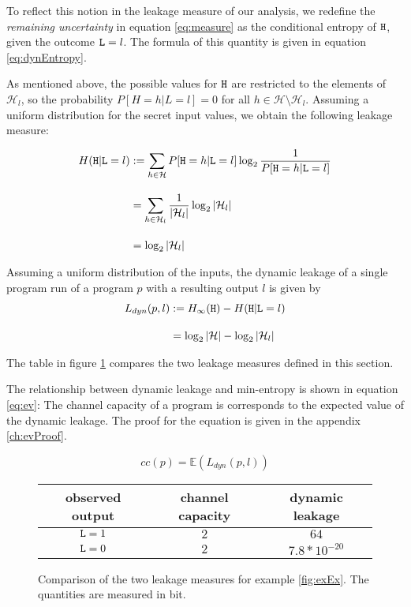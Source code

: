 To reflect this notion in the leakage measure of our analysis, we redefine the \emph{remaining uncertainty} in equation \ref{eq:measure} as the conditional entropy of $\mathtt{H}$, given the outcome $\mathtt{L} = l$. The formula of this quantity is given in equation \ref{eq:dynEntropy}.

As mentioned above, the possible values for $\mathtt{H}$ are restricted to the elements of $\mathcal{H}_l$, so the probability $P[H = h | L = l] = 0$ for all $h \in \mathcal{H} \setminus \mathcal{H}_l$. Assuming a uniform distribution for the secret input values, we obtain the following leakage measure:

\begin{align*}
    H(\mathtt{H} | \mathtt{L} = l) &:= \sum\limits_{h \in \mathcal{H}} P[\mathtt{H} = h | \mathtt{L} = l] \log_2 \frac{1}{P[\mathtt{H} = h | \mathtt{L} = l]} \\[1em]
    &= \sum\limits_{h \in \mathcal{H}_l} \frac{1}{|\mathcal{H}_l|} \log_2 |\mathcal{H}_l| \\[1em]
    &= \log_2 |\mathcal{H}_l|
\end{align*}

\begin{theorem}
    Assuming a uniform distribution of the inputs, the dynamic leakage of a single program run of a program $p$ with a resulting output $l$ is given by 
    \begin{align*}
        L_{dyn}(p, l) &:= H_\infty(\mathtt{H}) - H(\mathtt{H} | \mathtt{L} = l) \\[1em]
        &= \log_2 |\mathcal{H}| - \log_2 |\mathcal{H}_l|
    \end{align*}
\end{theorem}

The table in figure \ref{tab:comp} compares the two leakage measures defined in this section.

The relationship between dynamic leakage and min-entropy is shown in equation \ref{eq:ev}: The channel capacity of a program is corresponds to the expected value of the dynamic leakage. The proof for the equation is given in the appendix \ref{ch:evProof}.

\begin{center}
    \begin{equation}\label{eq:ev}
        cc(p) = \mathbb{E}(L_{dyn}(p, l))
    \end{equation}
\end{center}

\begin{figure}
    \centering
    \begin{tabular}{ |c|c|c| } 
        \hline
        observed output & channel capacity & dynamic leakage \\
        \hline
        $\mathtt{L} = 1$ & $2$ & $64$ \\ 
        $\mathtt{L} = 0$ & $2$ & $7.8 * 10^{-20}$ \\ 
        \hline
    \end{tabular}
    \caption{Comparison of the two leakage measures for example \ref{fig:exEx}. The quantities are measured in bit.}
    \label{tab:comp}
\end{figure}

